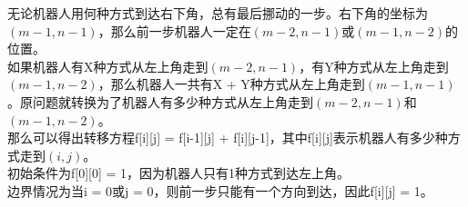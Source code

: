 \begin{table}[H]
	\centering
	\caption{终点}
\end{table}

无论机器人用何种方式到达右下角，总有最后挪动的一步。右下角的坐标为$ (m-1, n-1) $，那么前一步机器人一定在$ (m-2, n-1) $或$ (m-1, n-2) $的位置。\\

如果机器人有X种方式从左上角走到$ (m-2, n-1) $，有Y种方式从左上角走到$ (m-1, n-2) $，那么机器人一共有X + Y种方式从左上角走到$ (m-1, n-1) $。原问题就转换为了机器人有多少种方式从左上角走到$ (m-2, n-1) $和$ (m-1, n-2) $。\\

那么可以得出转移方程f[i][j] = f[i-1][j] + f[i][j-1]，其中f[i][j]表示机器人有多少种方式走到$ (i, j) $。\\

初始条件为f[0][0] = 1，因为机器人只有1种方式到达左上角。\\

边界情况为当i = 0或j = 0，则前一步只能有一个方向到达，因此f[i][j] = 1。

